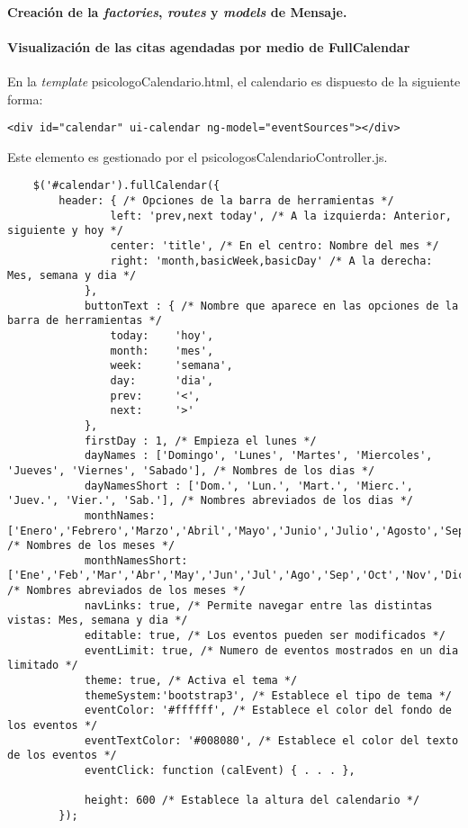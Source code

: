 \paragraph*{Creación de la \textit{factories}, \textit{routes} y \textit{models} de Mensaje.}


\paragraph*{Visualización de las citas agendadas por medio de FullCalendar}
En la \textit{template} psicologoCalendario.html, el calendario es dispuesto de la siguiente forma:


\medskip
\begin{lstlisting}
<div id="calendar" ui-calendar ng-model="eventSources"></div>
\end{lstlisting}


Este elemento es gestionado por el psicologosCalendarioController.js.


\medskip
\begin{lstlisting}
	$('#calendar').fullCalendar({
		header: { /* Opciones de la barra de herramientas */
				left: 'prev,next today', /* A la izquierda: Anterior, siguiente y hoy */
				center: 'title', /* En el centro: Nombre del mes */
				right: 'month,basicWeek,basicDay' /* A la derecha: Mes, semana y dia */
			},
			buttonText : { /* Nombre que aparece en las opciones de la barra de herramientas */
				today:    'hoy',
				month:    'mes',
				week:     'semana',
				day:      'dia',
				prev:	  '<',
				next:	  '>'
			},
			firstDay : 1, /* Empieza el lunes */
			dayNames : ['Domingo', 'Lunes', 'Martes', 'Miercoles', 'Jueves', 'Viernes', 'Sabado'], /* Nombres de los dias */
			dayNamesShort : ['Dom.', 'Lun.', 'Mart.', 'Mierc.', 'Juev.', 'Vier.', 'Sab.'], /* Nombres abreviados de los dias */
			monthNames: ['Enero','Febrero','Marzo','Abril','Mayo','Junio','Julio','Agosto','Septiembre','Octubre','Noviembre','Diciembre'], /* Nombres de los meses */
			monthNamesShort: ['Ene','Feb','Mar','Abr','May','Jun','Jul','Ago','Sep','Oct','Nov','Dic'], /* Nombres abreviados de los meses */
			navLinks: true, /* Permite navegar entre las distintas vistas: Mes, semana y dia */
			editable: true, /* Los eventos pueden ser modificados */
			eventLimit: true, /* Numero de eventos mostrados en un dia limitado */
			theme: true, /* Activa el tema */
			themeSystem:'bootstrap3', /* Establece el tipo de tema */
			eventColor: '#ffffff', /* Establece el color del fondo de los eventos */
			eventTextColor: '#008080', /* Establece el color del texto de los eventos */
			eventClick: function (calEvent) { . . . },

			height: 600 /* Establece la altura del calendario */
		});
\end{lstlisting}


